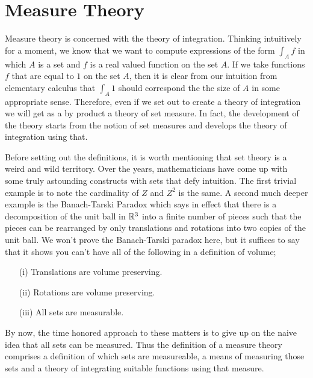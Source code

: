 \documentclass{amsart}
\theoremstyle{remark}
\theoremstyle{definition}
\begin{document}
\section{Measure Theory}
Measure theory is concerned with the theory of integration.  Thinking
intuitively for a moment, we know that we want to compute
expressions of the form $\int_A f$ in which $A$ is a set and $f$ is a
real valued function on the set $A$.  If we take functions $f$ that
are equal to $1$ on the set $A$, then it is clear from our intuition
from elementary calculus that $\int_A 1$ should correspond the the
size of $A$ in some appropriate sense.  Therefore, even if we set out
to create a theory of integration we will get as a by product a theory
of set measure.  In fact, the development of the theory starts from
the notion of set measures and develops the theory of integration
using that.

Before setting out the definitions, it is worth mentioning that set
theory is a weird and wild territory.  Over the years, mathematicians
have come up with some truly astounding constructs with sets that defy
intuition. The first trivial example is to note the cardinality of $Z$
and $Z^2$ is the same.  A second much deeper example is the
Banach-Tarski Paradox which says in effect that there is a
decomposition of the unit ball in $\mathbb{R}^3$ into a finite number of
pieces such that the pieces can be rearranged by only translations and
rotations into two copies of the unit ball.  We won't prove the
Banach-Tarski paradox here, but it suffices to say that it shows you
can't have all of the following in a definition of volume;
\begin{itemize}
\item[(i)]Translations are volume preserving.
\item[(ii)]Rotations are volume preserving.
\item[(iii)]All sets are measurable.
\end{itemize}

By now, the time honored approach to these matters is to give up on
the naive idea that all sets can be measured.  Thus the definition of a measure theory comprises a definition of
which sets are measureable, a means of measuring those sets and a
theory of integrating suitable functions using that measure.
\end{document}
